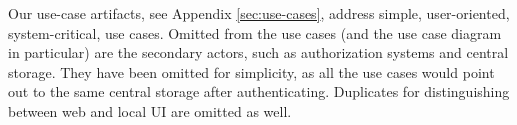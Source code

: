 Our use-case artifacts, see Appendix \ref{sec:use-cases}, address simple, user-oriented, system-critical, use cases.
Omitted from the use cases (and the use case diagram in particular) are the secondary actors, such as authorization systems and central storage.
They have been omitted for simplicity, as all the use cases would point out to the same central storage after authenticating. Duplicates for distinguishing between web  and local UI are omitted as well.
